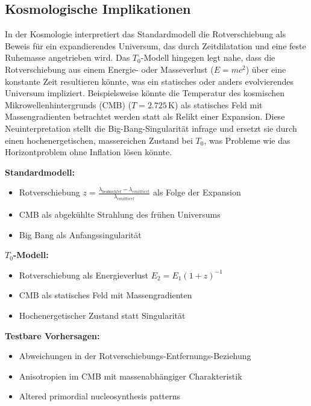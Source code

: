 \documentclass[a4paper,12pt]{article}
\begin{document}
	\subsection{Kosmologische Implikationen}
	In der Kosmologie interpretiert das Standardmodell die Rotverschiebung als Beweis für ein expandierendes Universum, das durch Zeitdilatation und eine feste Ruhemasse angetrieben wird. Das \( T_0 \)-Modell hingegen legt nahe, dass die Rotverschiebung aus einem Energie- oder Masseverlust (\( E = m c^2 \)) über eine konstante Zeit resultieren könnte, was ein statisches oder anders evolvierendes Universum impliziert. Beispielsweise könnte die Temperatur des kosmischen Mikrowellenhintergrunds (CMB) (\( T = 2.725 \, \text{K} \)) als statisches Feld mit Massengradienten betrachtet werden statt als Relikt einer Expansion. Diese Neuinterpretation stellt die Big-Bang-Singularität infrage und ersetzt sie durch einen hochenergetischen, massereichen Zustand bei \( T_0 \), was Probleme wie das Horizontproblem ohne Inflation lösen könnte.
	\begin{tcolorbox}[colback=green!5!white,colframe=green!75!black,title=Neuinterpretation kosmologischer Phänomene]
		\textbf{Standardmodell:}
		\begin{itemize}
			\item Rotverschiebung $z = \frac{\lambda_{beobachtet} - \lambda_{emittiert}}{\lambda_{emittiert}}$ als Folge der Expansion
			\item CMB als abgekühlte Strahlung des frühen Universums
			\item Big Bang als Anfangssingularität
		\end{itemize}
		
		\textbf{$T_0$-Modell:}
		\begin{itemize}
			\item Rotverschiebung als Energieverlust $E_2 = E_1(1+z)^{-1}$
			\item CMB als statisches Feld mit Massengradienten
			\item Hochenergetischer Zustand statt Singularität
		\end{itemize}
		
		\textbf{Testbare Vorhersagen:}
		\begin{itemize}
			\item Abweichungen in der Rotverschiebungs-Entfernungs-Beziehung
			\item Anisotropien im CMB mit massenabhängiger Charakteristik
			\item Altered primordial nucleosynthesis patterns
		\end{itemize}
	\end{tcolorbox}
	
\end{document}
